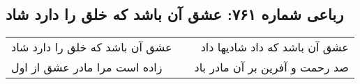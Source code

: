 \begin{center}
\section*{رباعی شماره ۷۶۱: عشق آن باشد که خلق را دارد شاد}
\label{sec:0761}
\begin{longtable}{l p{0.5cm} r}
عشق آن باشد که خلق را دارد شاد
&&
عشق آن باشد که داد شادیها داد
\\
زاده است مرا مادر عشق از اول
&&
صد رحمت و آفرین بر آن مادر باد
\\
\end{longtable}
\end{center}

